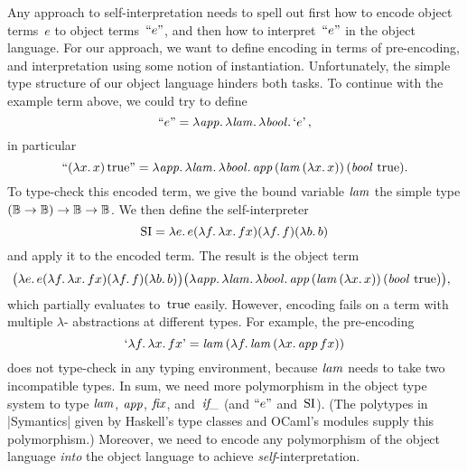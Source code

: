 Any approach to self\hyp interpretation needs to spell out first how to
encode object terms~$e$ to object terms~$\mathinner{\mathopen{\text{``}}e\mathclose{\text{''}}}$, and then how to
interpret~$\mathinner{\mathopen{\text{``}}e\mathclose{\text{''}}}$ in the object language.  For our approach, we
want to define encoding in terms of pre-encoding, and interpretation
using some notion of instantiation.  Unfortunately, the simple type
structure of our object language hinders both tasks.  To continue with
the example term above, we could try to define
\begin{equation}
    \mathinner{\mathopen{\text{``}}e\mathclose{\text{''}}} =
    \mathopen{\lambda\mathord{\mathinner{\text{\textit{app\/}}}}.\,} \mathopen{\lambda\mathord{\mathinner{\text{\textit{lam\/}}}}.\,} \mathopen{\lambda\mathord{\mathinner{\text{\textit{bool\/}}}}.\,} \mathinner{\mathopen{\text{`}}e\mathclose{\text{'}}},
\end{equation}
in particular
\begin{equation}
    \mathinner{\mathopen{\text{``}}(\mathopen{\lambda\mathord{x}.\,}x)\mathinner{\mathrm{true}}\mathclose{\text{''}}} =
    \mathopen{\lambda\mathord{\mathinner{\text{\textit{app\/}}}}.\,} \mathopen{\lambda\mathord{\mathinner{\text{\textit{lam\/}}}}.\,} \mathopen{\lambda\mathord{\mathinner{\text{\textit{bool\/}}}}.\,}
    \mathinner{\text{\textit{app\/}}} (\mathinner{\text{\textit{lam\/}}} (\mathopen{\lambda\mathord{x}.\,} x))\, (\mathinner{\text{\textit{bool\/}}}\, \mathinner{\mathrm{true}}).
\end{equation}
To type-check this encoded term, we give the bound variable $\mathinner{\text{\textit{lam\/}}}$ the
simple type $(\mathbb{B}\to\mathbb{B})\to\mathbb{B}\to\mathbb{B}$.
We then define the self\hyp interpreter
\begin{equation}
    \operatorname{SI} = \mathopen{\lambda\mathord{e}.\,} e
    (\mathopen{\lambda\mathord{f}.\,} \mathopen{\lambda\mathord{x}.\,} fx)
    (\mathopen{\lambda\mathord{f}.\,} f)
    (\mathopen{\lambda\mathord{b}.\,} b)
\end{equation}
and apply it to the encoded term.  The result is the object term
\begin{equation}
\kern-\mintagsep
    \bigl(\fun{e} e (\fun{f} \fun{x} fx) (\fun{f} f) (\fun{b} b)\bigr)
    \bigl(
    \fun{\ident{app}} \fun{\ident{lam}} \fun{\ident{bool}}
    \ident{app} (\ident{lam} (\fun{x} x))\, (\ident{bool}\, \True)
    \bigr),
\end{equation}
which partially evaluates to~$\mathinner{\mathrm{true}}$ easily.
However, encoding fails on a term with multiple $\lambda$\hyp
abstractions at different types.  For example, the pre-encoding
\begin{equation}
\label{e:pre-encoding-example}
    \encode{\fun{f}\fun{x}fx}
    = \ident{lam} (\fun{f} \ident{lam} (\fun{x} \ident{app} f x))
\end{equation}
does not type-check in any typing environment, because $\mathinner{\text{\textit{lam\/}}}$ needs
to take two incompatible types.  In sum, we need more polymorphism in the
object type system to type $\mathinner{\text{\textit{lam\/}}}$, $\mathinner{\text{\textit{app\/}}}$, $\mathinner{\text{\textit{fix\/}}}$,
and~$\mathinner{\text{\textit{if\_\/}}}$ (and $\mathinner{\mathopen{\text{``}}e\mathclose{\text{''}}}$ and~$\operatorname{SI}$).
(The polytypes in |Symantics| given by Haskell's type classes and OCaml's
modules supply this polymorphism.)  Moreover, we need to encode any
polymorphism of the object language \emph{into} the object language to achieve
\emph{self}\hyp interpretation.

